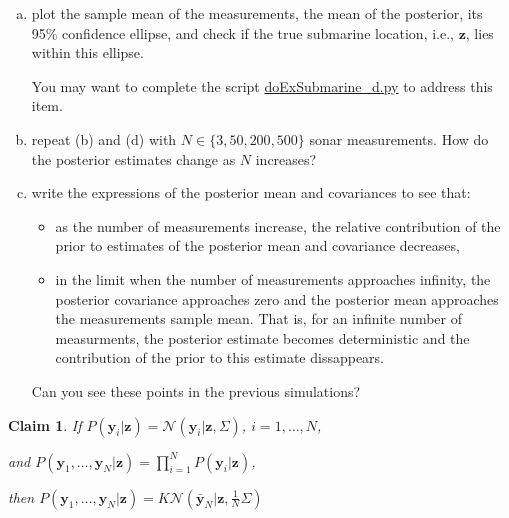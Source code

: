 \documentclass[12pt]{article}
\newtheorem{claim}{Claim}
\begin{document}
\begin{enumerate}[(a)]
        \item plot the sample mean of the measurements, the mean of the posterior, its 95\% confidence ellipse, and
            check if the true submarine location, i.e., $\mathbf{z}$, lies
            within this ellipse.

            You may want to complete the script
            \href{http://github.com/joacorapela/gcnu\_bridging2023}{doExSubmarine\_d.py}
            to address this item.

        \item repeat (b) and (d) with $N\in\{3,50,200,500\}$ sonar
            measurements. How do the posterior estimates change as $N$
            increases?

        \item write the expressions of the posterior mean and covariances to
            see that:

            \begin{itemize}

                \item as the number of measurements increase, the relative
                    contribution of the prior to estimates of the posterior
                    mean and covariance decreases,

                \item in the limit when the number of measurements approaches
                    infinity, the posterior covariance approaches zero and the
                    posterior mean approaches the measurements sample mean.
                    That is, for an infinite number of measurments, the
                    posterior estimate becomes deterministic and the
                    contribution of the prior to this estimate dissappears.

            \end{itemize}

            Can you see these points in the previous simulations?

    \end{enumerate}

    \pagebreak

    \begin{claim}
        If
        $P(\mathbf{y}_i|\mathbf{z})=\mathcal{N}\left(\mathbf{y}_i|\mathbf{z},\Sigma\right)$,
        $i=1,\ldots,N$, 

        and
        $P(\mathbf{y}_1,\ldots,\mathbf{y}_N|\mathbf{z})=\prod_{i=1}^N
        P(\mathbf{y}_i|\mathbf{z})$, 

        then
        $P(\mathbf{y}_1,\ldots,\mathbf{y}_N|\mathbf{z})=K\mathcal{N}(\bar{\mathbf{y}}_N|\mathbf{z},\frac{1}{N}\Sigma)$
        \label{claim:likelihoodForZ}
    \end{claim}
\end{document}
